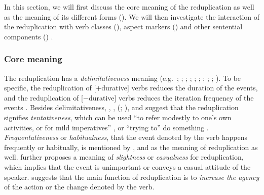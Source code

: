 In this section, we will first discuss the core meaning of the reduplication as well as the meaning of its different forms ().
We will then investigate the interaction of the reduplication with verb classes (), aspect markers () and other sentential components () .

\subsubsection{Core meaning}\label{sec:core-sem}

The reduplication has a \textit{delimitativeness} meaning (e.g.\ \citealt[204--205]{Chao1968}; \citealt[232]{LiThompson1981};  \citealt[14]{Li1996}; \citealt[70]{Dai1997};  \citealt[382--383]{Zhu1998}; \citealt[420--421]{Xing2000}; \citealt[48]{Chen2001};  \citealt[288]{Tsao2001}; \citealt[11--12]{Yang2003}; \citealt[Sec.\,4.3]{XiaoMcEnery2004}). 
To be specific, the reduplication of [$+$durative] verbs reduces the duration of the events,
and the reduplication of [$-$durative] verbs reduces the iteration frequency of the events \citetext{\citealp[14]{Li1996}; \citealp[149--150]{XiaoMcEnery2004}}.
Besides delimitativeness, \citet[204]{Chao1968}, \citet[276]{Fan1964}, \citeauthor{Smith1991} (\citeyear[356]{Smith1991}; \citeyear[199--120]{Smith1994}), \citet[14]{Li1996} and \citet[290--291]{Tsao2001} suggest that the reduplication signifies \textit{tentativeness}, which can be used
``to refer modestly to one's own activities, or for mild imperatives'' \citep[356]{Smith1991}, or ``trying to'' do something \citep[234]{LiThompson1981}.
\textit{Frequentativeness} or \textit{habitualness}, that the event denoted by the verb happens frequently or habitually, is mentioned by \citet[276]{Fan1964}, \citet[15]{Li1996} and \citet[1]{Qian2000} as the meaning of reduplication as well.
 \citet[276]{Fan1964} further proposes a meaning of \textit{slightness} or \textit{casualness} for reduplication, which implies that the event is unimportant or conveys a casual attitude of the speaker.
 \citet[Sec.\,3.1.3]{Zhu1998} suggests that the main function of reduplication is to \textit{increase the agency} of the action or the change denoted by the verb.


